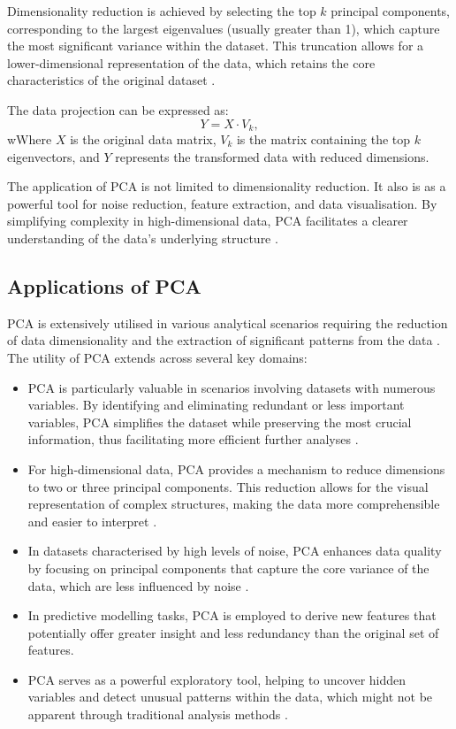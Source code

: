 \documentclass[conference]{IEEEtran}
\begin{document}
Dimensionality reduction is achieved by selecting the top $k$ principal components, corresponding to the largest eigenvalues (usually greater than 1), which capture the most significant variance within the dataset. This truncation allows for a lower-dimensional representation of the data, which retains the core characteristics of the original dataset \cite{shlens2014tutorial}.

The data projection can be expressed as:
\[
Y = X \cdot V_k,
\]
wWhere $X$ is the original data matrix, $V_k$ is the matrix containing the top $k$ eigenvectors, and $Y$ represents the transformed data with reduced dimensions.

The application of PCA is not limited to dimensionality reduction. It also is as a powerful tool for noise reduction, feature extraction, and data visualisation. By simplifying complexity in high-dimensional data, PCA facilitates a clearer understanding of the data's underlying structure \cite{ivosev2008dimensionality}.

\subsection{Applications of PCA}

PCA is extensively utilised in various analytical scenarios requiring the reduction of data dimensionality and the extraction of significant patterns from the data \cite{wang2003feature}. The utility of PCA extends across several key domains:
\begin{itemize}
    \item PCA is particularly valuable in scenarios involving datasets with numerous variables. By identifying and eliminating redundant or less important variables, PCA simplifies the dataset while preserving the most crucial information, thus facilitating more efficient further analyses \cite{wu2007feature}.
    \item For high-dimensional data, PCA provides a mechanism to reduce dimensions to two or three principal components. This reduction allows for the visual representation of complex structures, making the data more comprehensible and easier to interpret \cite{hasan2021review}.
    \item In datasets characterised by high levels of noise, PCA enhances data quality by focusing on principal components that capture the core variance of the data, which are less influenced by noise \cite{ivosev2008dimensionality}.
    \item In predictive modelling tasks, PCA is employed to derive new features that potentially offer greater insight and less redundancy than the original set of features\cite{wang2003feature}.
    \item PCA serves as a powerful exploratory tool, helping to uncover hidden variables and detect unusual patterns within the data, which might not be apparent through traditional analysis methods \cite{wu2007feature}.

\end{itemize}
\end{document}
